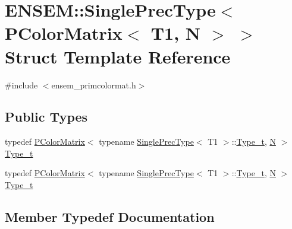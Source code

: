 \hypertarget{structENSEM_1_1SinglePrecType_3_01PColorMatrix_3_01T1_00_01N_01_4_01_4}{}\section{E\+N\+S\+EM\+:\+:Single\+Prec\+Type$<$ P\+Color\+Matrix$<$ T1, N $>$ $>$ Struct Template Reference}
\label{structENSEM_1_1SinglePrecType_3_01PColorMatrix_3_01T1_00_01N_01_4_01_4}


{\ttfamily \#include $<$ensem\+\_\+primcolormat.\+h$>$}

\subsection*{Public Types}
\begin{DoxyCompactItemize}
\item 
typedef \mbox{\hyperlink{classENSEM_1_1PColorMatrix}{P\+Color\+Matrix}}$<$ typename \mbox{\hyperlink{structENSEM_1_1SinglePrecType}{Single\+Prec\+Type}}$<$ T1 $>$\+::\mbox{\hyperlink{structENSEM_1_1SinglePrecType_3_01PColorMatrix_3_01T1_00_01N_01_4_01_4_a75f8a27b94fdcd735897c0556a26c7e3}{Type\+\_\+t}}, \mbox{\hyperlink{operator__name__util_8cc_a7722c8ecbb62d99aee7ce68b1752f337}{N}} $>$ \mbox{\hyperlink{structENSEM_1_1SinglePrecType_3_01PColorMatrix_3_01T1_00_01N_01_4_01_4_a75f8a27b94fdcd735897c0556a26c7e3}{Type\+\_\+t}}
\item 
typedef \mbox{\hyperlink{classENSEM_1_1PColorMatrix}{P\+Color\+Matrix}}$<$ typename \mbox{\hyperlink{structENSEM_1_1SinglePrecType}{Single\+Prec\+Type}}$<$ T1 $>$\+::\mbox{\hyperlink{structENSEM_1_1SinglePrecType_3_01PColorMatrix_3_01T1_00_01N_01_4_01_4_a75f8a27b94fdcd735897c0556a26c7e3}{Type\+\_\+t}}, \mbox{\hyperlink{operator__name__util_8cc_a7722c8ecbb62d99aee7ce68b1752f337}{N}} $>$ \mbox{\hyperlink{structENSEM_1_1SinglePrecType_3_01PColorMatrix_3_01T1_00_01N_01_4_01_4_a75f8a27b94fdcd735897c0556a26c7e3}{Type\+\_\+t}}
\end{DoxyCompactItemize}


\subsection{Member Typedef Documentation}
\mbox{\label{structENSEM_1_1SinglePrecType_3_01PColorMatrix_3_01T1_00_01N_01_4_01_4_a75f8a27b94fdcd735897c0556a26c7e3}} 
